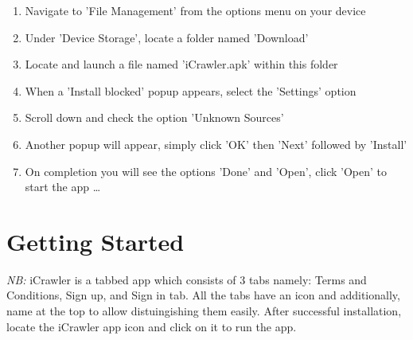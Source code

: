 \documentclass[hidelinks, 12pt, oneside]{article}
\begin{document}
	 \begin{enumerate}
 	 	\item Navigate to 'File Management' from the options menu on your device
 	 	\item Under 'Device Storage', locate a folder named 'Download'
 	 	\item Locate and launch a file named 'iCrawler.apk' within this folder
 	 	\item When a 'Install blocked' popup appears, select the 'Settings' option
 	 	\item Scroll down and check the option 'Unknown Sources'
 	 	\item Another popup will appear, simply click 'OK' then 'Next' followed by 'Install'
 	 	\item On completion you will see the options 'Done' and 'Open', click 'Open' to start the app \ldots
 	\end{enumerate}\newpage


	\section{Getting Started}
	\emph{NB:} iCrawler is a tabbed app which consists of 3 tabs namely: Terms and Conditions, Sign up, and Sign in tab. All the tabs have an icon and additionally, name at the top to allow distuingishing them easily.\newline \newline
	After successful installation, locate the iCrawler app icon and click on it to run the app.\newpage
	
\end{document}
